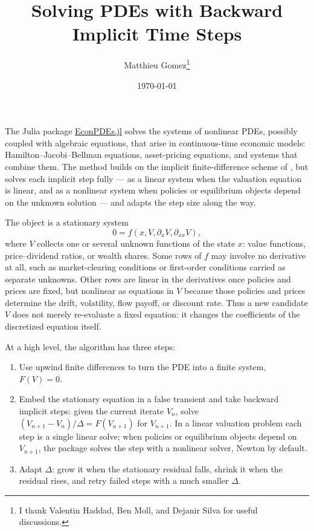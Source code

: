 \documentclass[11pt]{article}
\numberwithin{equation}{section}
\begin{document}
	\title{Solving PDEs with Backward Implicit Time Steps}
	\author{Matthieu Gomez\thanks{I thank Valentin Haddad, Ben Moll, and Dejanir Silva for useful discussions.}}
	\date{\monthyeardate\today}
	\maketitle

	The Julia package \href{https://github.com/matthieugomez/EconPDEs.jl}{EconPDEs.jl} solves the systems of nonlinear PDEs, possibly coupled with algebraic equations, that arise in continuous-time economic models: Hamilton--Jacobi--Bellman equations, asset-pricing equations, and systems that combine them. The method builds on the implicit finite-difference scheme of \citet{achdou2022income}, but solves each implicit step fully --- as a linear system when the valuation equation is linear, and as a nonlinear system when policies or equilibrium objects depend on the unknown solution --- and adapts the step size along the way.

	The object is a stationary system
	\begin{equation}\tag{PDE}\label{eq:pde}
		0 = f\left(x, V, \partial_x V, \partial_{xx} V\right),
	\end{equation}
	where $V$ collects one or several unknown functions of the state $x$: value functions, price--dividend ratios, or wealth shares. Some rows of $f$ may involve no derivative at all, such as market-clearing conditions or first-order conditions carried as separate unknowns. Other rows are linear in the derivatives once policies and prices are fixed, but nonlinear as equations in $V$ because those policies and prices determine the drift, volatility, flow payoff, or discount rate. Thus a new candidate $V$ does not merely re-evaluate a fixed equation: it changes the coefficients of the discretized equation itself.

		At a high level, the algorithm has three steps:
		\begin{enumerate}
			\item Use upwind finite differences to turn the PDE into a finite system, $F(V) = 0$.
			\item Embed the stationary equation in a false transient and take backward implicit steps: given the current iterate $V_n$, solve $(V_{n+1}-V_n)/\Delta = F(V_{n+1})$ for $V_{n+1}$. In a linear valuation problem each step is a single linear solve; when policies or equilibrium objects depend on $V_{n+1}$, the package solves the step with a nonlinear solver, Newton by default.
			\item Adapt $\Delta$: grow it when the stationary residual falls, shrink it when the residual rises, and retry failed steps with a much smaller $\Delta$.
		\end{enumerate}
\end{document}
